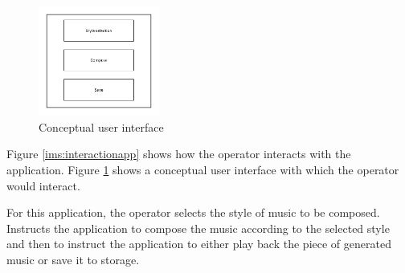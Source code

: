 \begin{figure}[ht]
\centerline{\includegraphics[width=150px]{../images/user_interface.pdf}}
\caption{Conceptual user interface}
\label{ims:conceptuserinterface}
\end{figure}

Figure \ref{ims:interactionapp} shows how the operator interacts with the application. Figure \ref{ims:conceptuserinterface} shows a conceptual user interface with which the operator would interact.

For this application, the operator selects the style of music to be composed. Instructs the application to compose the music according to the selected style and then to instruct the application to either play back the piece of generated music or save it to storage.
